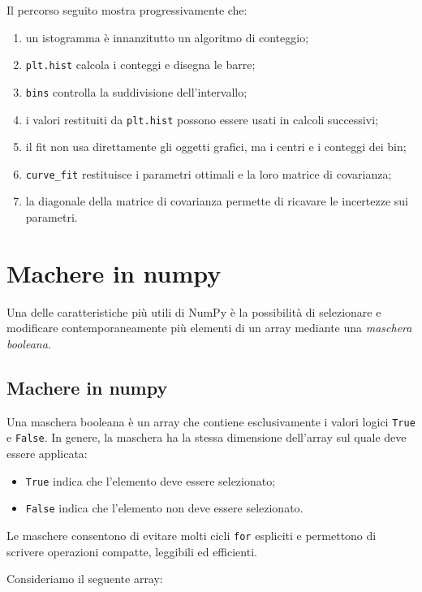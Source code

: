 \documentclass[11pt,a4paper]{book}
\begin{document}
Il percorso seguito mostra progressivamente che:

\begin{enumerate}
    \item un istogramma è innanzitutto un algoritmo di conteggio;
    \item \texttt{plt.hist} calcola i conteggi e disegna le barre;
    \item \texttt{bins} controlla la suddivisione dell'intervallo;
    \item i valori restituiti da \texttt{plt.hist} possono essere usati
          in calcoli successivi;
    \item il fit non usa direttamente gli oggetti grafici, ma i centri e
          i conteggi dei bin;
    \item \texttt{curve\_fit} restituisce i parametri ottimali e la loro
          matrice di covarianza;
    \item la diagonale della matrice di covarianza permette di ricavare
          le incertezze sui parametri.
\end{enumerate}




\chapter{Machere in numpy}
Una delle caratteristiche più utili di NumPy è la possibilità di selezionare e modificare contemporaneamente più elementi di un array mediante una \emph{maschera booleana}.

\section{Machere in numpy}
Una maschera booleana è un array che contiene esclusivamente i valori logici \texttt{True} e \texttt{False}. In genere, la maschera ha la stessa dimensione dell'array sul quale deve essere applicata:

\begin{itemize}
    \item \texttt{True} indica che l'elemento deve essere selezionato;
    \item \texttt{False} indica che l'elemento non deve essere selezionato.
\end{itemize}

Le maschere consentono di evitare molti cicli \texttt{for} espliciti e permettono di scrivere operazioni compatte, leggibili ed efficienti.

Consideriamo il seguente array:
\end{document}
